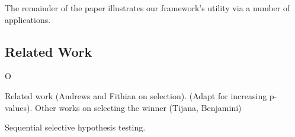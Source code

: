 \documentclass{article}
\begin{document}
The remainder of the paper illustrates our framework's utility via a number of applications. 





\subsection{Related Work}


O%




Related work (Andrews and Fithian on selection). (Adapt for increasing p-values). Other works on selecting the winner (Tijana, Benjamini) 

Sequential selective hypothesis testing. 
\end{document}
